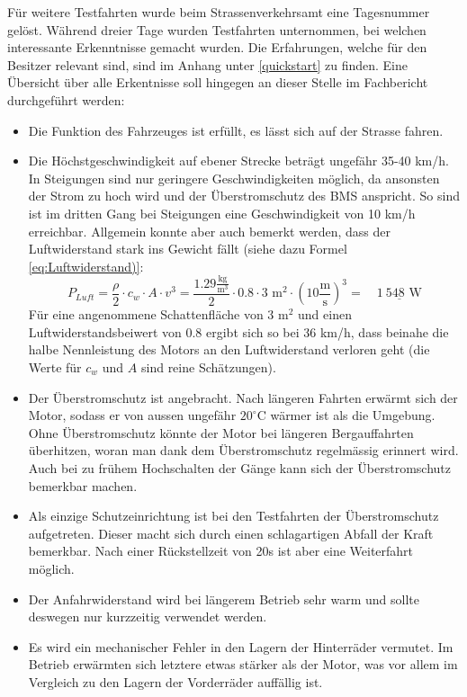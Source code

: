 Für weitere Testfahrten wurde beim Strassenverkehrsamt eine Tagesnummer gelöst. Während dreier Tage wurden Testfahrten unternommen, bei welchen interessante Erkenntnisse gemacht wurden. Die Erfahrungen, welche für den Besitzer relevant sind, sind im Anhang unter \ref{quickstart} zu finden. Eine Übersicht über alle Erkentnisse soll hingegen an dieser Stelle im Fachbericht durchgeführt werden: \begin{itemize}
	\item Die Funktion des Fahrzeuges ist erfüllt, es lässt sich auf der Strasse fahren.
	\item Die Höchstgeschwindigkeit auf ebener Strecke beträgt ungefähr 35-40 km/h. In Steigungen sind nur geringere Geschwindigkeiten möglich, da ansonsten der Strom zu hoch wird und der Überstromschutz des BMS anspricht. So sind ist im dritten Gang bei Steigungen eine Geschwindigkeit von 10 km/h erreichbar. Allgemein konnte aber auch bemerkt werden, dass der Luftwiderstand stark ins Gewicht fällt (siehe dazu Formel \ref{eq:Luftwiderstand)}:
	\begin{equation}
		P_{Luft}=\frac{\rho}{2}\cdot c_w\cdot A\cdot v^3=\frac{1.29\frac{\text{kg}}{\text{m}^3}}{2}\cdot 0.8\cdot 3\text{ m}^2\cdot\left(10\frac{\text{m}}{\text{s}}\right)^3=\quad\underline{1\ 548\text{ W}}
	\label{eq:Luftwiderstand}
	\end{equation}
	Für eine angenommene Schattenfläche von $3$ m$^2$ und einen Luftwiderstandsbeiwert von 0.8 ergibt sich so bei 36 km/h, dass beinahe die halbe Nennleistung des Motors an den Luftwiderstand verloren geht (die Werte für $c_w$ und $A$ sind reine Schätzungen).
	\item Der Überstromschutz ist angebracht. Nach längeren Fahrten erwärmt sich der Motor, sodass er von aussen ungefähr $20^\circ$C wärmer ist als die Umgebung. Ohne Überstromschutz könnte der Motor bei längeren Bergauffahrten überhitzen, woran man dank dem Überstromschutz regelmässig erinnert wird. Auch bei zu frühem Hochschalten der Gänge kann sich der Überstromschutz bemerkbar machen.
	\item Als einzige Schutzeinrichtung ist bei den Testfahrten der Überstromschutz aufgetreten. Dieser macht sich durch einen schlagartigen Abfall der Kraft bemerkbar. Nach einer Rückstellzeit von 20s ist aber eine Weiterfahrt möglich.
	\item Der Anfahrwiderstand wird bei längerem Betrieb sehr warm und sollte deswegen nur kurzzeitig verwendet werden.
	\item Es wird ein mechanischer Fehler in den Lagern der Hinterräder vermutet. Im Betrieb erwärmten sich letztere etwas stärker als der Motor, was vor allem im Vergleich zu den Lagern der Vorderräder auffällig ist.

\end{itemize}

